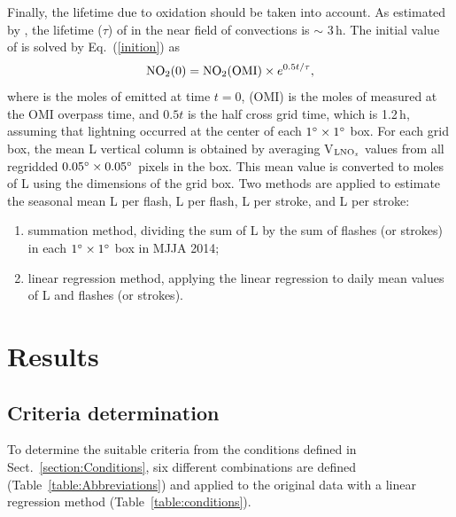 \documentclass[amt]{copernicus}
\begin{document}
Finally, the  lifetime due to oxidation should be taken into account.
As estimated by \citet{Nault.2017}, the lifetime ($\tau$) of  in the near field of convections is $\sim$ 3\,h.
The initial value of  is solved by Eq.~(\ref{inition}) as
\begin{equation} \label{inition}
\chem{NO_2}(0) = \chem{NO_2}(\mathrm{OMI}) \times e^{0.5t/\tau},
\end{equation}
where  is the moles of  emitted at time $t = 0$, (OMI) is the moles of  measured at the OMI overpass time, and $0.5t$ is the half cross grid time, which is 1.2\,h, assuming that lightning occurred at the center of each $1{^{\circ}}\times 1{^{\circ}}$ box.
For each grid box, the mean L vertical column is obtained by averaging V$_\chem{LNO_\mathit{x}}$ values from all regridded $0.05{^{\circ}}\times 0.05{^{\circ}}$ pixels in the box.
This mean value is converted to moles of L using the dimensions of the grid box.
Two methods are applied to estimate the seasonal mean L per flash, L per flash, L per stroke, and L per stroke:
\begin{enumerate}
\item summation method, dividing the sum of L by the sum of flashes (or strokes) in each $1{^{\circ}}\times 1{^{\circ}}$ box in MJJA 2014;

\item linear regression method, applying the linear regression to daily mean values of L and flashes (or strokes).
\end{enumerate}

\section{Results} \label{section:Results}
\subsection{Criteria determination} \label{section:Criteria}
To determine the suitable criteria from the conditions defined in Sect.~\ref{section:Conditions}, six different combinations are defined (Table~\ref{table:Abbreviations}) and applied to the original data with a linear regression method (Table~\ref{table:conditions}).
\end{document}
